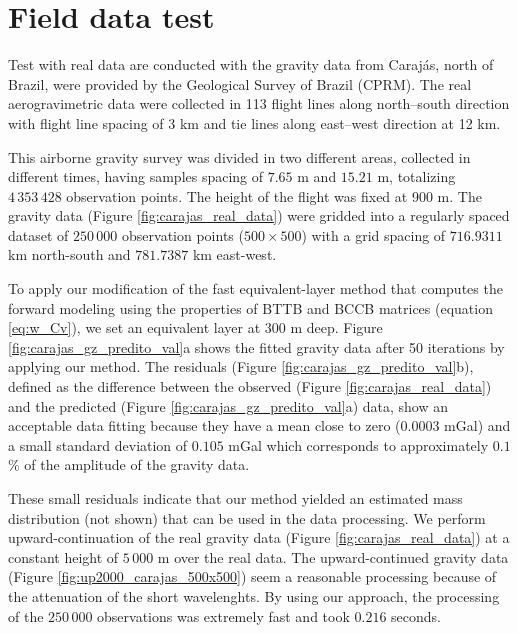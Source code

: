 \section{Field data test}
Test with real data are conducted with the gravity data from Caraj\'as, north of Brazil, were provided by the  Geological 
Survey of Brazil (CPRM). The real aerogravimetric data were collected in 113 flight lines along north–south direction 
with flight line spacing  of 3 km and tie lines along east–west direction at 12 km.

This airborne gravity survey was divided in two different areas, collected in different times, having samples spacing of 
$7.65$ m and $15.21$ m, totalizing  $4\,353\,428$ observation points. The height of the flight was fixed at 900 m. 
The gravity data (Figure \ref{fig:carajas_real_data}) were gridded into a regularly spaced dataset of $250\,000$ 
observation points ($500 \times 500$) with a grid spacing of $716.9311$ km north-south and $781.7387$ km east-west.

To apply our modification of the fast equivalent-layer method \cite[]{siqueira-etal2017}  that computes the forward 
modeling using the properties of BTTB and BCCB matrices (equation \ref{eq:w_Cv}), we set an equivalent layer at 300 m deep. 
Figure \ref{fig:carajas_gz_predito_val}a shows the fitted gravity data after 50 iterations by applying our method. 
The residuals (Figure \ref{fig:carajas_gz_predito_val}b), defined as the difference between the observed 
(Figure \ref{fig:carajas_real_data}) and the predicted (Figure \ref{fig:carajas_gz_predito_val}a) data, show an 
acceptable data fitting because they have a mean close to zero ($0.0003$ mGal) and a small standard deviation of 
$0.105$ mGal which corresponds to approximately $0.1$ \% of the amplitude of the gravity data.

These small residuals indicate that our method yielded an estimated mass distribution (not shown) that can be used in 
the data processing. We perform upward-continuation of the real gravity data (Figure \ref{fig:carajas_real_data}) at 
a constant height of $5\,000$ m over the real data. The upward-continued gravity data 
(Figure \ref{fig:up2000_carajas_500x500}) seem a reasonable processing because of the attenuation of the short 
wavelenghts. By using our approach, the processing of the $250\,000$ observations was extremely fast and took 
$0.216$ seconds.